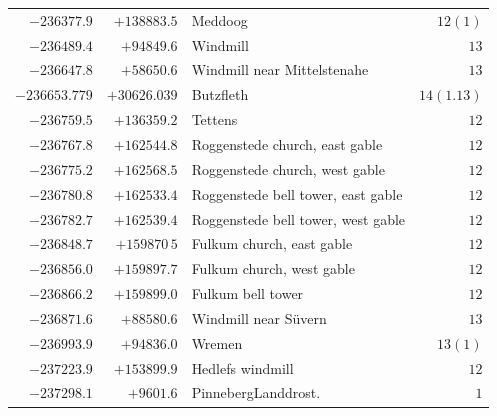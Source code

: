 \begin{center}
\begin{tabular}{r|r|p{170pt}|r}
\(-236377.9\)&\(+138883.5\)&Meddoog&\(12(1)\)\\
\(-236489.4\)&\(+94849.6\)&Windmill&\(13\)\\
\(-236647.8\)&\(+58650.6\)&Windmill near Mittelstenahe&\(13\)\\
\(-236653.779\)&\(+30626.039\)&Butzfleth&\(14(1.13)\)\\
\(-236759.5\)&\(+136359.2\)&Tettens&\(12\)\\
\(-236767.8\)&\(+162544.8\)&Roggenstede church, east gable&\(12\)\\
\(-236775.2\)&\(+162568.5\)&Roggenstede church, west gable&\(12\)\\
\(-236780.8\)&\(+162533.4\)&Roggenstede bell tower, east gable&\(12\)\\
\(-236782.7\)&\(+162539.4\)&Roggenstede bell tower, west gable&\(12\)\\
\(-236848.7\)&\(+159870\,5\)&Fulkum church, east gable&\(12\)\\
\(-236856.0\)&\(+159897.7\)&Fulkum church, west gable&\(12\)\\
\(-236866.2\)&\(+159899.0\)&Fulkum bell tower&\(12\)\\
\(-236871.6\)&\(+88580.6\)&Windmill near Süvern&\(13\)\\
\(-236993.9\)&\(+94836.0\)&Wremen&\(13(1)\)\\
\(-237223.9\)&\(+153899.9\)&Hedlefs windmill&\(12\)\\
\(-237298.1\)&\(+9601.6\)&PinnebergLanddrost.&\(1\)\\
\hline\end{tabular}\endgroup\end{center}
